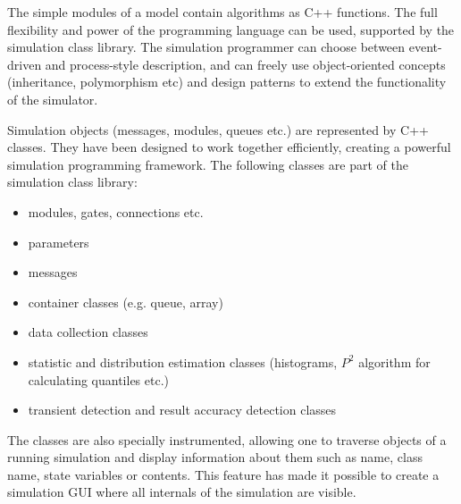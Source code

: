 The simple modules of a model contain algorithms
as C++ functions.
The full flexibility and power of the programming language can
be used, supported by the {\opp} simulation class library.
The simulation programmer can choose between event-driven and process-style
description, and can freely use object-oriented concepts
(inheritance, polymorphism etc) and design patterns to extend the
functionality of the simulator.

Simulation objects (messages, modules, queues etc.) are represented
by C++ classes. They have been designed to work together efficiently,
creating a powerful simulation programming framework.
The following classes are part of the simulation class library:

\begin{itemize}
  \item{modules, gates, connections etc.}
  \item{parameters}
  \item{messages}
  \item{container classes (e.g. queue, array)}
  \item{data collection classes}
  \item{statistic and distribution estimation classes (histograms, $P^2$
  algorithm for calculating quantiles etc.)}
  \item{transient detection and result accuracy detection classes}
\end{itemize}

The classes are also specially instrumented, allowing one
to traverse objects of a running simulation and display information
about them such as name, class name, state variables or contents.
This feature has made it possible to create a simulation GUI where
all internals of the simulation are visible.


